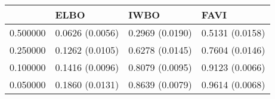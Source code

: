 \begin{tabular}{llll}
\toprule
 & ELBO & IWBO & FAVI \\
\midrule
0.500000 & 0.0626 (0.0056) & 0.2969 (0.0190) & 0.5131 (0.0158) \\
0.250000 & 0.1262 (0.0105) & 0.6278 (0.0145) & 0.7604 (0.0146) \\
0.100000 & 0.1416 (0.0096) & 0.8079 (0.0095) & 0.9123 (0.0066) \\
0.050000 & 0.1860 (0.0131) & 0.8639 (0.0079) & 0.9614 (0.0068) \\
\bottomrule
\end{tabular}
